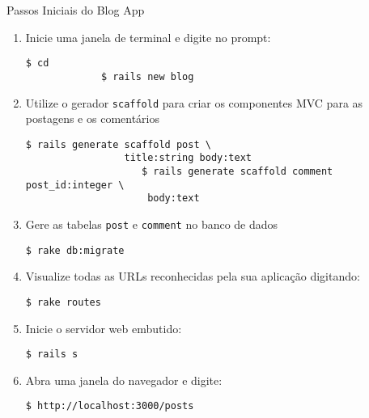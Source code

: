 \begin{frame}{Passos Iniciais do Blog App}
	\begin{enumerate}
	    \item Inicie uma janela de terminal e digite no prompt:
	     \begin{lstlisting}[style=BashInputBasicStyle]
		     $ cd 
		     $ rails new blog
	     \end{lstlisting}
	    \item Utilize o gerador \verb|scaffold| para criar os 
	    componentes MVC para as postagens e os comentários
	     \begin{lstlisting}[style=BashInputBasicStyle]
					$ rails generate scaffold post \ 
			     title:string body:text
					$ rails generate scaffold comment post_id:integer \
					 body:text
	     \end{lstlisting}
	    \item Gere as tabelas \verb|post| e \verb|comment| no banco de dados
	    \begin{lstlisting}[style=BashInputBasicStyle]
		    $ rake db:migrate
	    \end{lstlisting}
	    
	    \item Visualize todas as URLs reconhecidas pela sua aplicação digitando:
	    \begin{lstlisting}[style=BashInputBasicStyle]
	    $ rake routes
	    \end{lstlisting}
	     \item Inicie o servidor web embutido:
	     \begin{lstlisting}[style=BashInputBasicStyle]
	     $ rails s
	     \end{lstlisting}
	     
	     \item Abra uma janela do navegador e digite:
	     \begin{lstlisting}[style=BashInputBasicStyle]
	     $ http://localhost:3000/posts
	     \end{lstlisting}
	\end{enumerate}
  
\end{frame}